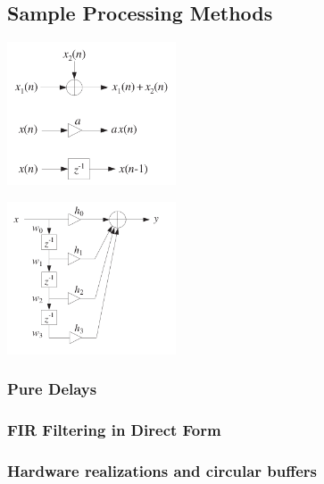\subsection{Sample Processing Methods}
  \begin{multicols}{3}
    \includegraphics[width=5cm]{./picture/basic_blocks}
    
  \columnbreak
  
    \includegraphics[width=5cm]{./picture/bd_internal_states}
 
 \columnbreak
\subsubsection{Pure Delays}
\subsubsection{FIR Filtering in Direct Form}
\subsubsection{Hardware realizations and circular buffers }
 \end{multicols}